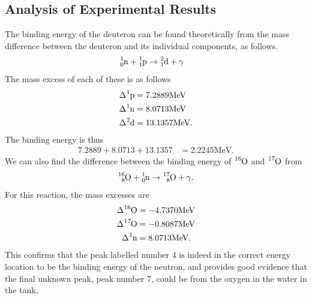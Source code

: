 \subsection{Analysis of Experimental Results} %
\label{sub:analysis_of_experimental_results}
The binding energy of the deuteron can be found theoretically from the mass difference between the deuteron and its individual components, as follows.
\begin{align}
	\ce{^1_0 n} + \ce{^1_1 p} &\rightarrow \ce{^2_1 d} + \gamma
\end{align}
The mass excess of each of these is as follows
\begin{align*}
	\Delta \ce{^1 p} &= 7.2889 \text{MeV} \\
	\Delta \ce{^1 n} &= 8.0713 \text{MeV} \\
	\Delta \ce{^2 d} &= 13.1357 \text{MeV}.
\end{align*}
The binding energy is thus
\begin{align}
	7.2889 + 8.0713 + 13.1357 &= 2.2245 \text{MeV}.
\end{align}
We can also find the difference between the binding energy of $\ce{^{16}O}$ and $\ce{^{17}O}$ from
\begin{align}
	\ce{^{16}_8 O} + \ce{^1_0 n} \rightarrow \ce{^{17}_8 O} + \gamma.
\end{align}
For this reaction, the mass excesses are
\begin{align*}
	\Delta \ce{^{16} O} &= -4.7370 \text{MeV} \\
	\Delta \ce{^{17} O} &= -0.8087 \text{MeV} \\
	\Delta \ce{^1 n} &= 8.0713 \text{MeV}.
\end{align*}
This confirms that the peak labelled number 4 is indeed in the correct energy location to be the binding energy of the neutron, and provides good evidence that the final unknown peak, peak number 7, could be from the oxygen in the water in the tank.


